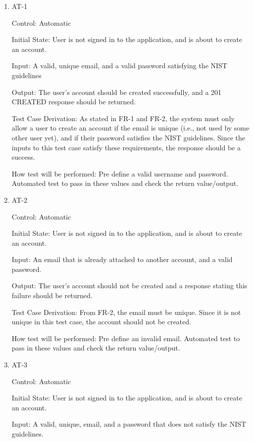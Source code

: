 \documentclass[12pt, titlepage]{article}
\begin{document}
\begin{enumerate}

\item{AT-1\\}

Control: Automatic
					
Initial State: User is not signed in to the application, and is about to create an account.
					
Input: A valid, unique email, and a valid password satisfying the NIST guidelines
					
Output: The user's account should be created successfully, and a 201 CREATED response should be returned.

Test Case Derivation: As stated in FR-1 and FR-2, the system must only allow a user to create an account if the email is unique (i.e., not 
used by some other user yet), and if their password satisfies the NIST guidelines. Since the inputs to this test case satisfy these 
requirements, the response should be a success.
					
How test will be performed: Pre define a valid username and password. Automated test to pass in these values and check the return value/output.
					
\item{AT-2\\}

Control: Automatic
					
Initial State: User is not signed in to the application, and is about to create an account.
					
Input: An email that is already attached to another account, and a valid password.
					
Output: The user's account should not be created and a response stating this failure should be returned.

Test Case Derivation: From FR-2, the email must be unique. Since it is not unique in this test case, the account should not 
be created.

How test will be performed: Pre define an invalid email. Automated test to pass in these values and check the return value/output.

\item{AT-3\\}

Control: Automatic
					
Initial State: User is not signed in to the application, and is about to create an account.
					
Input: A valid, unique, email, and a password that does not satisfy the NIST guidelines.
					

\end{enumerate}
\end{document}
